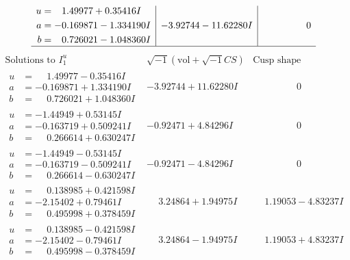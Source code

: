 \documentclass[1p]{elsarticle_modified}
\theoremstyle{definition}
\newcommand{\I}{\sqrt{-1}}
\begin{document}
$$\begin{array}{c|c|c}
\begin{aligned}
u &= \phantom{-}1.49977 + 0.35416 I \\
a &= -0.169871 - 1.334190 I \\
b &= \phantom{-}0.726021 - 1.048360 I\end{aligned}
 & -3.92744 - 11.62280 I & \phantom{-0.000000 } 0\\
 \hline 
 \end{array}$$\newpage$$\begin{array}{c|c|c}  
\text{Solutions to }I^u_{1}& \I (\text{vol} + \sqrt{-1}CS) & \text{Cusp shape}\\
 \hline 
\begin{aligned}
u &= \phantom{-}1.49977 - 0.35416 I \\
a &= -0.169871 + 1.334190 I \\
b &= \phantom{-}0.726021 + 1.048360 I\end{aligned}
 & -3.92744 + 11.62280 I & \phantom{-0.000000 } 0 \\ \hline\begin{aligned}
u &= -1.44949 + 0.53145 I \\
a &= -0.163719 + 0.509241 I \\
b &= \phantom{-}0.266614 + 0.630247 I\end{aligned}
 & -0.92471 + 4.84296 I & \phantom{-0.000000 } 0 \\ \hline\begin{aligned}
u &= -1.44949 - 0.53145 I \\
a &= -0.163719 - 0.509241 I \\
b &= \phantom{-}0.266614 - 0.630247 I\end{aligned}
 & -0.92471 - 4.84296 I & \phantom{-0.000000 } 0 \\ \hline\begin{aligned}
u &= \phantom{-}0.138985 + 0.421598 I \\
a &= -2.15402 + 0.79461 I \\
b &= \phantom{-}0.495998 + 0.378459 I\end{aligned}
 & \phantom{-}3.24864 + 1.94975 I & \phantom{-}1.19053 - 4.83237 I \\ \hline\begin{aligned}
u &= \phantom{-}0.138985 - 0.421598 I \\
a &= -2.15402 - 0.79461 I \\
b &= \phantom{-}0.495998 - 0.378459 I\end{aligned}
 & \phantom{-}3.24864 - 1.94975 I & \phantom{-}1.19053 + 4.83237 I \\ \hline\begin{aligned}

\end{aligned}
\end{array}$$
\end{document}
